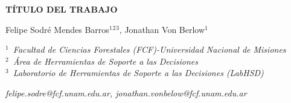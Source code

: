 \documentclass[11pt]{article}
\begin{document}
\begin{center}
\begin{Large}
\textbf{TÍTULO DEL TRABAJO}
\end{Large}
\vspace{0.6cm}

Felipe Sodré Mendes Barros$^1$$^2$$^3$, Jonathan Von Berlow$^1$  

\vspace{0.6cm}
\textit{$^1$\  Facultad de Ciencias Forestales (FCF)-Universidad Nacional de Misiones}\\
\textit{$^2$\ Área de Herramientas de Soporte a las Decisiones}\\
\textit{$^3$\ Laboratorio de Herramientas de Soporte a las Decisiones (LabHSD)}

\vspace{0.6cm}
\textit{felipe.sodre@fcf.unam.edu.ar, jonathan.vonbelow@fcf.unam.edu.ar }
\end{center}
\end{document}

